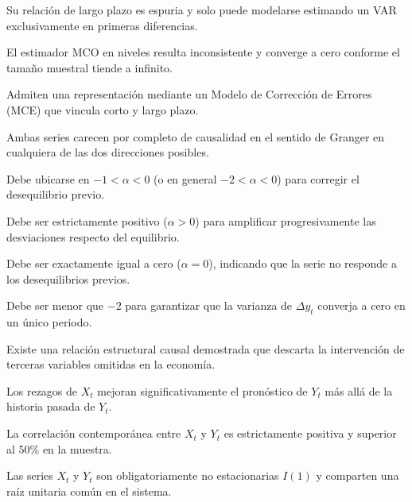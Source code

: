 \begin{opts}
    \item Su relación de largo plazo es espuria y solo puede modelarse estimando un VAR exclusivamente en primeras diferencias.
    \item El estimador MCO en niveles resulta inconsistente y converge a cero conforme el tamaño muestral tiende a infinito.
    \item Admiten una representación mediante un Modelo de Corrección de Errores (MCE) que vincula corto y largo plazo.
    \item Ambas series carecen por completo de causalidad en el sentido de Granger en cualquiera de las dos direcciones posibles.
\end{opts}

\begin{opts}
    \item Debe ubicarse en $-1 < \alpha < 0$ (o en general $-2 < \alpha < 0$) para corregir el desequilibrio previo.
    \item Debe ser estrictamente positivo ($\alpha > 0$) para amplificar progresivamente las desviaciones respecto del equilibrio.
    \item Debe ser exactamente igual a cero ($\alpha = 0$), indicando que la serie no responde a los desequilibrios previos.
    \item Debe ser menor que $-2$ para garantizar que la varianza de $\Delta y_t$ converja a cero en un único periodo.
\end{opts}

\begin{opts}
    \item Existe una relación estructural causal demostrada que descarta la intervención de terceras variables omitidas en la economía.
    \item Los rezagos de $X_t$ mejoran significativamente el pronóstico de $Y_t$ más allá de la historia pasada de $Y_t$.
    \item La correlación contemporánea entre $X_t$ y $Y_t$ es estrictamente positiva y superior al $50\%$ en la muestra.
    \item Las series $X_t$ y $Y_t$ son obligatoriamente no estacionarias $I(1)$ y comparten una raíz unitaria común en el sistema.
\end{opts}

